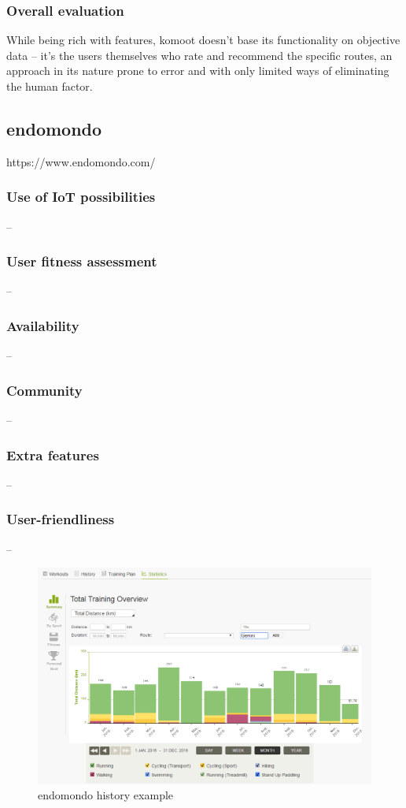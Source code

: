 \subsubsection*{Overall evaluation}
While being rich with features, komoot doesn't base its functionality on objective data -- it's the users themselves who rate and recommend the specific routes,
an approach in its nature prone to error and with only limited ways of eliminating the human factor.

\subsection{endomondo}
https://www.endomondo.com/
\subsubsection*{Use of IoT possibilities} --
\subsubsection*{User fitness assessment} --
\subsubsection*{Availability} --
\subsubsection*{Community} -- 
\subsubsection*{Extra features} -- 
\subsubsection*{User-friendliness} -- 
\begin{figure}[h]
    \includegraphics[width=\textwidth]{Images/endomondo-history-example.png}
    \caption{endomondo history example\cite{endomondo-history-img}}
\end{figure}

